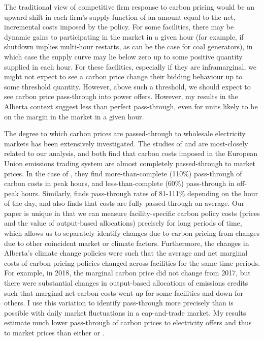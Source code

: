 \documentclass[12pt]{article}
\begin{document}
The traditional view of competitive firm response to carbon pricing would be an upward shift in each firm's supply function of an amount equal to the net, incremental costs imposed by the policy. For some facilities, there may be dynamic gains to participating in the market in a given hour (for example, if shutdown implies multi-hour restarts, as can be the case for coal generators), in which case the supply curve may lie below zero up to some positive quantity supplied in each hour. For these facilities, especially if they are inframarginal, we might not expect to see a carbon price change their bidding behaviour up to some threshold quantity. However, above such a threshold, we should expect to see carbon price pass-through into power offers. However, my results in the Alberta context suggest less than perfect pass-through, even for units likely to be on the margin in the market in a given hour.

The degree to which carbon prices are passed-through to wholesale electricity markets has been extensively investigated. The studies of \cite{fabra_reguant} and \cite{hintermann16_germany} are most-closely related to our analysis, and both find that carbon costs imposed in the European Union emissions trading system are almost completely passed-through to market prices. In the case of \citeauthor{fabra_reguant}, they find more-than-complete (110\%) pass-through of carbon costs in peak hours, and less-than-complete (60\%) pass-through in off-peak hours. Similarly, \citeauthor{hintermann16_germany} finds pass-through rates of 81-111\% depending on the hour of the day, and also finds that costs are fully passed-through on average. Our paper is unique in that we can measure facility-specific carbon policy costs (prices and the value of output-based allocations) precisely for long periods of time, which allows us to separately identify changes due to carbon pricing from changes due to other coincident market or climate factors. Furthermore, the changes in Alberta's climate change policies were such that the average and net marginal costs of carbon pricing policies changed across facilities for the same time periods. For example, in 2018, the marginal carbon price did not change from 2017, but there were substantial changes in output-based allocations of emissions credits such that marginal net carbon costs went up for some facilities and down for others. I use this variation to identify pass-through more precisely than is possible with daily market fluctuations in a cap-and-trade market. My results estimate much lower pass-through of carbon prices to electricity offers and thus to market prices than either \cite{fabra_reguant} or \cite{hintermann16_germany}.
\end{document}
